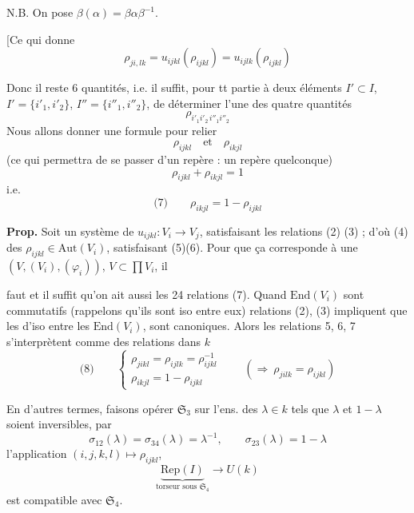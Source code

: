 \documentclass[11pt,a4paper]{article}
\begin{document}
N.B. On pose $\beta(\alpha) = \beta\alpha\beta^{-1}$.

[Ce qui donne
\[
\rho_{ji,lk} = u_{ijkl}(\rho_{ijkl}) = u_{ijlk}(\rho_{ijkl})
\]

Donc il reste  \struck{\ill{}} 6 quantités, i.e.  il suffit, pour tt  partie à deux éléments $I'\subset I$, $I'=\{i'_1,i'_2\}$, $I''=\{i''_1,i''_2\}$, de déterminer l'une des quatre quantités
\[
\rho_{i'_1 i'_2\, i''_1 i''_2}
\]
Nous allons \struck{\ill{}} donner une formule pour relier
\[
\rho_{ijkl} \quad\text{et}\quad \rho_{ikjl}
\]
(ce qui permettra de se passer d'un repère : un repère quelconque)
\[
\rho_{ijkl} + \rho_{ikjl} = 1
\]
i.e.
\[
\text{(7)}\qquad \boxed{\rho_{ikjl} = 1 - \rho_{ijkl}}
\]
\marginal{[Faire vérification}

\textbf{Prop.} Soit un système de $u_{ijkl} : V_i \to V_j$, satisfaisant les relations (2) (3) ; d'où (4) des $\rho_{ijkl}\in\mathrm{Aut}(V_i)$, satisfaisant (5)(6). Pour que ça corresponde à une  \ill{} $(V,(V_i),(\varphi_i))$, \struck{\ill{}} $V\subset\prod V_i$, il

faut et il suffit qu'on ait aussi les 24 relations (7). Quand  $\mathrm{End}(V_i)$ sont commutatifs (rappelons qu'ils sont iso entre eux)     relations (2), (3) impliquent que les  d'iso entre les $\mathrm{End}(V_i)$, sont \struck{\ill{}} canoniques. Alors les relations 5, 6, 7 s'interprètent comme des relations dans \struck{\ill{}} $k$
\[
\text{(8)}\qquad
\begin{cases}
\rho_{jikl} = \rho_{ijlk} = \rho_{ijkl}^{-1}\\
\rho_{ikjl} = 1 - \rho_{ijkl}
\end{cases}
\qquad (\Rightarrow\ \rho_{jilk} = \rho_{ijkl})
\]

En d'autres termes, faisons opérer $\mathfrak S_3$ sur l'ens.  des $\lambda\in k$ tels que $\lambda$ et $1-\lambda$ soient inversibles, par
\[
\sigma_{12}(\lambda) = \sigma_{34}(\lambda) = \lambda^{-1}, \qquad \sigma_{23}(\lambda) = 1-\lambda
\]
l'application \struck{\ill{}}  $(i,j,k,l)\mapsto\rho_{ijkl}$,
\[
\underbrace{\mathrm{Rep}(I)}_{\text{torseur sous }\mathfrak S_4} \longrightarrow U(k)
\]
est compatible avec $\mathfrak S_4$.
\end{document}
